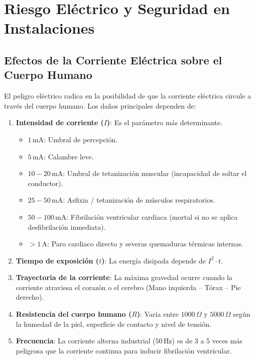 \documentclass[]{informeutn}
\begin{document}
\chapter{Riesgo Eléctrico y Seguridad en Instalaciones}

\section{Efectos de la Corriente Eléctrica sobre el Cuerpo Humano}
El peligro eléctrico radica en la posibilidad de que la corriente eléctrica circule a través del cuerpo humano. Los daños principales dependen de:

\begin{enumerate}
    \item \textbf{Intensidad de corriente ($I$)}: Es el parámetro más determinante.
    \begin{itemize}
        \item $1\,\text{mA}$: Umbral de percepción.
        \item $5\,\text{mA}$: Calambre leve.
        \item $10 - 20\,\text{mA}$: Umbral de tetanización muscular (incapacidad de soltar el conductor).
        \item $25 - 50\,\text{mA}$: Asfixia / tetanización de músculos respiratorios.
        \item $50 - 100\,\text{mA}$: Fibrilación ventricular cardiaca (mortal si no se aplica desfibrilación inmediata).
        \item $> 1\,\text{A}$: Paro cardiaco directo y severas quemaduras térmicas internas.
    \end{itemize}
    \item \textbf{Tiempo de exposición ($t$)}: La energía disipada depende de $I^2 \cdot t$.
    \item \textbf{Trayectoria de la corriente}: La máxima gravedad ocurre cuando la corriente atraviesa el corazón o el cerebro (Mano izquierda -- Tórax -- Pie derecho).
    \item \textbf{Resistencia del cuerpo humano ($R$)}: Varía entre $1000\,\Omega$ y $5000\,\Omega$ según la humedad de la piel, superficie de contacto y nivel de tensión.
    \item \textbf{Frecuencia}: La corriente alterna industrial ($50\,\text{Hz}$) es de 3 a 5 veces más peligrosa que la corriente continua para inducir fibrilación ventricular.
\end{enumerate}
\end{document}

